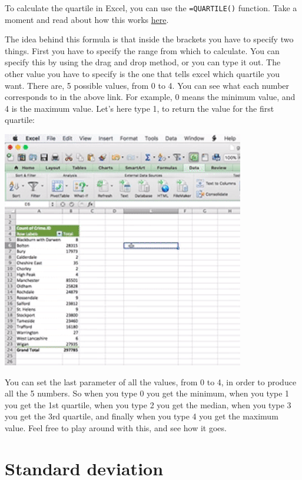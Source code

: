 \documentclass[
]{book}
\begin{document}
To calculate the quartile in Excel, you can use the \texttt{=QUARTILE()} function. Take a moment and read about how this works \href{https://support.office.com/en-gb/article/QUARTILE-function-93cf8f62-60cd-4fdb-8a92-8451041e1a2a}{here}.

The idea behind this formula is that inside the brackets you have to specify two things. First you have to specify the range from which to calculate. You can specify this by using the drag and drop method, or you can type it out. The other value you have to specify is the one that tells excel which quartile you want. There are, 5 possible values, from 0 to 4. You can see what each number corresponds to in the above link. For example, 0 means the minimum value, and 4 is the maximum value. Let's here type 1, to return the value for the first quartile:

\includegraphics{imgs/quartile.gif}

You can set the last parameter of all the values, from 0 to 4, in order to produce all the 5 numbers. So when you type 0 you get the minimum, when you type 1 you get the 1st quartile, when you type 2 you get the median, when you type 3 you get the 3rd quartile, and finally when you type 4 you get the maximum value. Feel free to play around with this, and see how it goes.

\hypertarget{standard-deviation}{%
\section{Standard deviation}\label{standard-deviation}}
\end{document}
